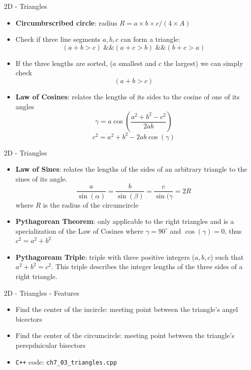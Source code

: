 \documentclass{beamer}
\begin{document}
\begin{frame}{2D - Triangles}
    \begin{itemize}
        \item \textbf{Circumbrscribed circle}: radius $R = a\times b\times c / (4\times A)$
        \item Check if three line segments $a,b,c$ can form a triangle: $$(a+b>c) \;\&\& (a+c>b) \;\&\& (b+c > a)$$
        \item If the three lengths are sorted, ($a$ smallest and $c$ the largest) we can simply check $$(a+b > c)$$
        \item \textbf{Law of Cosines}: relates the lengths of its sides to the cosine of one of its angles $$\gamma = a\cos (\frac{a^2+b^2 - c^2}{2ab})$$ $$c^2 = a^2 + b^2 -2ab\cos(\gamma)$$
    \end{itemize}
\end{frame}

\begin{frame}{2D - Triangles}
    \begin{itemize}
        \item \textbf{Law of Sines}: relates the lengths of the sides of an arbitrary triangle to the sines of its angle. $$\frac{a}{\sin(\alpha)} = \frac{b}{\sin(\beta)} = \frac{c}{\sin(\gamma} = 2R$$ where $R$ is the radius of the circumcircle
        \item \textbf{Pythagorean Theorem}: only applicable to the right triangles and is a specialization of the Law of Cosines where $\gamma = 90^\circ$ and $\cos(\gamma) = 0$, thus $c^2 = a^2 + b^2$
        \item \textbf{Pythagoream Triple}: triple with three positive integers ($a,b,c$) such that $a^2 + b^2 = c^2$. This triple describes the integer lengths of the three sides of a right triangle. 
    \end{itemize}
\end{frame}

\begin{frame}[fragile]{2D - Triangles - Features}
    \begin{itemize}
        \item Find the center of the incircle: meeting point between the triangle's angel bicectors
        \item Find the center of the circumcircle: meeting point between the triangle's perepdnicular bisectors
		\item \color{red} \verb|C++| code: \verb|ch7_03_triangles.cpp| \color{black}
    \end{itemize}
\end{frame}
\end{document}
